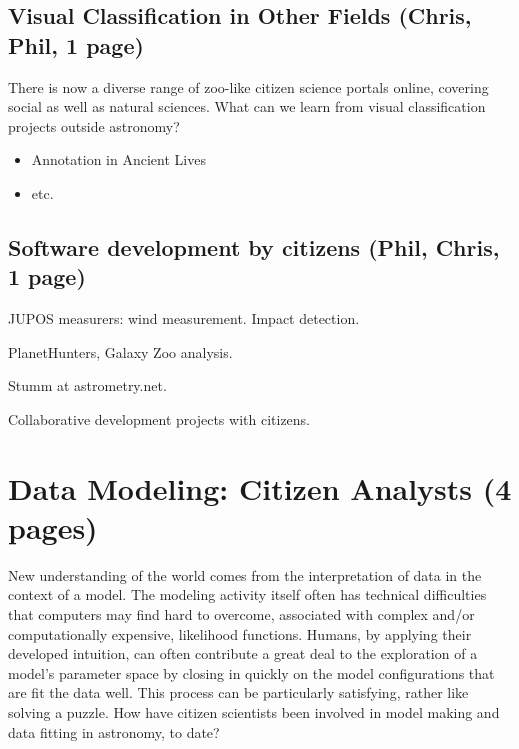 \documentclass{ar2e}
\begin{document}
\subsection{Visual Classification in Other Fields (\textbf{Chris}, Phil, 1 page)}
\label{sec:class:non-astro}

There is now a diverse range of zoo-like citizen science portals online,
covering social as well as natural sciences. What can we learn from visual
classification projects outside astronomy?

\begin{itemize}
\item Annotation in Ancient Lives
\item etc.
\end{itemize}




\subsection{Software development by citizens (\textbf{Phil}, Chris, 1 page)}
\label{sec:instr:software}

JUPOS measurers: wind measurement. 
Impact detection.

PlanetHunters, Galaxy Zoo analysis.

Stumm at astrometry.net.  

Collaborative development projects with citizens. 




\section{Data Modeling: Citizen Analysts (4 pages)}
\label{sec:model}

New understanding of the world comes from the interpretation of data in the
context of a model. The modeling activity itself often has technical
difficulties that computers may find hard to overcome, associated with complex
and/or computationally expensive, likelihood functions. Humans, by applying
their developed intuition, can often contribute a great deal to the
exploration of a model's parameter space by closing in quickly on the model
configurations that are fit the data well. This process can be particularly
satisfying, rather like solving a puzzle. How have citizen scientists been
involved in model making and data fitting in astronomy, to date?
\end{document}
